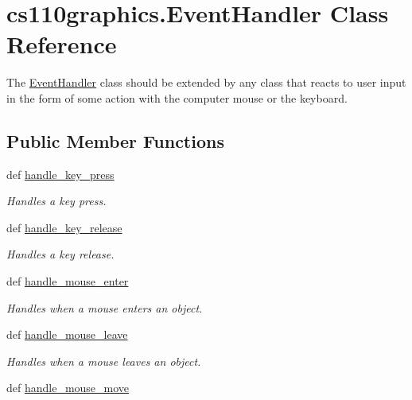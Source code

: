 \hypertarget{classcs110graphics_1_1EventHandler}{
\section{cs110graphics.EventHandler Class Reference}
\label{classcs110graphics_1_1EventHandler}
}


The \hyperlink{classcs110graphics_1_1EventHandler}{EventHandler} class should be extended by any class that reacts to user input in the form of some action with the computer mouse or the keyboard.  
\subsection*{Public Member Functions}
\begin{DoxyCompactItemize}
\item 
def \hyperlink{classcs110graphics_1_1EventHandler_af3fb3531d0b23f1430a830586cd07906}{handle\_\-key\_\-press}
\begin{DoxyCompactList}\small\item\em Handles a key press. \item\end{DoxyCompactList}\item 
def \hyperlink{classcs110graphics_1_1EventHandler_a2849f60251baa44252992162521f2473}{handle\_\-key\_\-release}
\begin{DoxyCompactList}\small\item\em Handles a key release. \item\end{DoxyCompactList}\item 
def \hyperlink{classcs110graphics_1_1EventHandler_a13af3268f8a1aa36b8483eb2deffef15}{handle\_\-mouse\_\-enter}
\begin{DoxyCompactList}\small\item\em Handles when a mouse enters an object. \item\end{DoxyCompactList}\item 
def \hyperlink{classcs110graphics_1_1EventHandler_a5deaf2b6b8055e97ac0ddf6603132c64}{handle\_\-mouse\_\-leave}
\begin{DoxyCompactList}\small\item\em Handles when a mouse leaves an object. \item\end{DoxyCompactList}\item 
def \hyperlink{classcs110graphics_1_1EventHandler_a521fdcd170d15c0b8baa124c78b6d1ef}{handle\_\-mouse\_\-move}

\end{DoxyCompactItemize}
